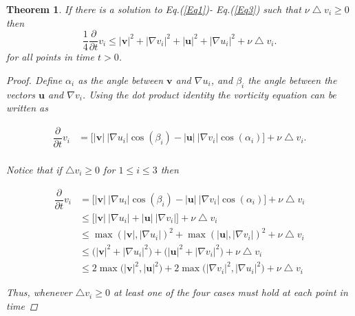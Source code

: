 \documentclass[amsmath,12pt,a4paper]{amsart}
\newtheorem{theorem}{Theorem}
\begin{document}
\begin{theorem}\label{Thm3}
If there is a solution to Eq.(\ref{Eq1})- Eq.(\ref{Eq3})  such that $\nu \bigtriangleup v_i \ge 0 $ then  $$
\dfrac{1}{4}\dfrac{\partial}{\partial t} v_i \le |\textbf{v}|^2+ |\nabla v_i |^2 + |\textbf{u}|^2+  |\nabla u_i|^2 + \nu \bigtriangleup v_i.
$$ for all points in time $t>0$.

\begin{proof}
Define $\alpha_i$ as the angle between $\textbf{v}$ and $\nabla u_i$, and $\beta_i$ the angle between the vectors $\textbf{u}$ and $\nabla v_i$. Using the dot product identity the vorticity equation can be written as

\begin{equation}\label{Eq22}
\begin{split}
\dfrac{\partial}{\partial t} v_i &  = \biggl[|\textbf{v}|~|\nabla u_i|\cos(\beta_i)- |\textbf{u}|~|\nabla v_i|\cos(\alpha_i)\biggr]+  \nu \bigtriangleup v_i.\\
\end{split}
\end{equation}

Notice that if $\bigtriangleup v_i\ge 0$ for $1\le i\le 3$ then 

\begin{equation}\label{Eq23}
\begin{split}
\dfrac{\partial}{\partial t} v_i &  = \biggl[|\textbf{v}|~|\nabla u_i|\cos(\beta_i)- |\textbf{u}|~|\nabla v_i|\cos(\alpha_i)\biggr]+  \nu \bigtriangleup v_i\\
& \le  \biggl[|\textbf{v}|~|\nabla u_i|+ |\textbf{u}|~|\nabla v_i|\biggr]+  \nu \bigtriangleup v_i \\
& \le \max(|\textbf{v}|, |\nabla u_i |)^2 + \max(|\textbf{u}|, |\nabla v_i |)^2 +\nu \bigtriangleup v_i\\
& \le \biggl(|\textbf{v}|^2 + |\nabla u_i|^2\biggr) + \biggl(|\textbf{u}|^2 + |\nabla v_i|^2\biggr) + \nu \bigtriangleup v_i\\
&\le  2\max\biggl(|\textbf{v}|^2, |\textbf{u}|^2\biggr) +  2\max\biggl(|\nabla v_i|^2, |\nabla u_i|^2\biggr) +\nu \bigtriangleup v_i
\end{split}
\end{equation}

Thus, whenever $\bigtriangleup v_i\ge 0$ at least one of the four cases must hold at each point in time


\end{proof}
\end{theorem}
\end{document}
